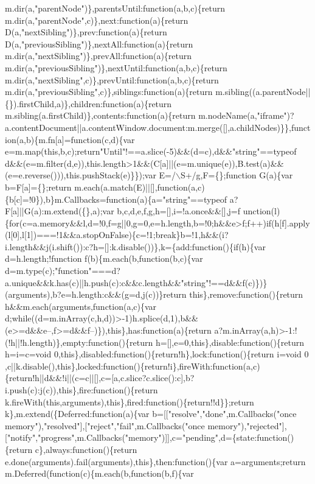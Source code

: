 \begin{DoxyCode}
{       m.dir(a,"parentNode")\},parentsUntil:function(a,b,c)\{return m.dir(a,"parentNode",c)\},next:function(a)\{return
       D(a,"nextSibling")\},prev:function(a)\{return D(a,"previousSibling")\},nextAll:function(a)\{return
       m.dir(a,"nextSibling")\},prevAll:function(a)\{return m.dir(a,"previousSibling")\},nextUntil:function(a,b,c)\{return
       m.dir(a,"nextSibling",c)\},prevUntil:function(a,b,c)\{return m.dir(a,"previousSibling",c)\},siblings:function(a)\{return
       m.sibling((a.parentNode||\{\}).firstChild,a)\},children:function(a)\{return
       m.sibling(a.firstChild)\},contents:function(a)\{return
       m.nodeName(a,"iframe")?a.contentDocument||a.contentWindow.document:m.merge([],a.childNodes)\}\},function(a,b)\{m.fn[a]=function(c,d)\{var
       e=m.map(this,b,c);return"Until"!==a.slice(-5)&&(d=c),d&&"string"==typeof
       d&&(e=m.filter(d,e)),this.length>1&&(C[a]||(e=m.unique(e)),B.test(a)&&(e=e.reverse())),this.pushStack(e)\}\});var E=/\(\backslash\)S+/g,F=\{\};function G(a)\{var b=F[a]=\{\};return
       m.each(a.match(E)||[],function(a,c)\{b[c]=!0\}),b\}m.Callbacks=function(a)\{a="string"==typeof a?F[a]||G(a):m.extend(\{\},a);var
       b,c,d,e,f,g,h=[],i=!a.once&&[],j=f
      unction(l)\{for(c=a.memory&&l,d=!0,f=g||0,g=0,e=h.length,b=!0;h&&e>f;f++)if(h[f].apply(l[0],l[1])===!1&&a.stopOnFalse)\{c=!1;break\}b=!1,h&&(i?i.length&&j(i.shift()):c?h=[]:k.disable())\},k=\{add:function()\{if(h)\{var
       d=h.length;!function f(b)\{m.each(b,function(b,c)\{var
       d=m.type(c);"function"===d?a.unique&&k.has(c)||h.push(c):c&&c.length&&"string"!==d&&f(c)\})\}(arguments),b?e=h.length:c&&(g=d,j(c))\}return
       this\},remove:function()\{return h&&m.each(arguments,function(a,c)\{var
       d;while((d=m.inArray(c,h,d))>-1)h.splice(d,1),b&&(e>=d&&e--,f>=d&&f--)\}),this\},has:function(a)\{return a?m.inArray(a,h)>-1:!(!h||!h.length)\},empty:function()\{return
       h=[],e=0,this\},disable:function()\{return h=i=c=void 0,this\},disabled:function()\{return!h\},lock:function()\{return i=void
       0
      ,c||k.disable(),this\},locked:function()\{return!i\},fireWith:function(a,c)\{return!h||d&&!i||(c=c||[],c=[a,c.slice?c.slice():c],b?i.push(c):j(c)),this\},fire:function()\{return
       k.fireWith(this,arguments),this\},fired:function()\{return!!d\}\};return k\},m.extend(\{Deferred:function(a)\{var b=[["resolve","done",m.Callbacks("once
       memory"),"resolved"],["reject","fail",m.Callbacks("once
       memory"),"rejected"],["notify","progress",m.Callbacks("memory")]],c="pending",d=\{state:function()\{return c\},always:function()\{return
       e.done(arguments).fail(arguments),this\},then:function()\{var a=arguments;return m.Deferred(function(c)\{m.each(b,function(b,f)\{var
}
\end{DoxyCode}
